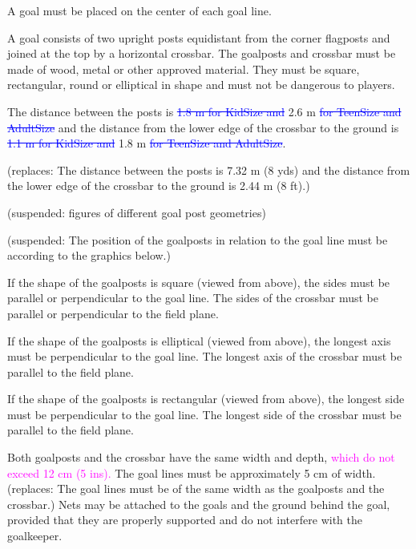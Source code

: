 \headlinebox

A goal must be placed on the center of each goal line.


\bigskip

A goal consists of two upright posts equidistant from the corner flagposts and joined at the top by a horizontal crossbar. The goalposts and crossbar must be made of wood, metal or other approved material. They must be square, rectangular, round or elliptical in shape and must
not be dangerous to players.

\bigskip

The distance between the posts is \textcolor{blue}{\sout{1.8 m for KidSize and}} 2.6 m \textcolor{blue}{\sout{for TeenSize and AdultSize}} and the distance from the lower edge of the crossbar to the ground is \textcolor{blue}{\sout{1.1 m for KidSize and}} 1.8 m \textcolor{blue}{\sout{for TeenSize and AdultSize}}. 

{\color[rgb]{0.4,0.4,0.4}
(replaces: The distance between the posts is 7.32 m (8 yds) and the distance from the lower edge of the crossbar to the ground is 2.44 m (8 ft).)}

\bigskip

{\color[rgb]{0.4,0.4,0.4}
(suspended: figures of different goal post geometries)}

\bigskip

{\color[rgb]{0.4,0.4,0.4}
(suspended: The position of the goalposts in relation to the goal line must be according to the graphics below.)}

\bigskip

If the shape of the goalposts is square (viewed from above), the sides must be parallel or perpendicular to the goal line. The sides of the crossbar must be parallel or perpendicular to the field plane.

\bigskip

If the shape of the goalposts is elliptical (viewed from above), the longest axis must be perpendicular to the goal line. The longest axis of the crossbar must be parallel to the field plane.

\bigskip

If the shape of the goalposts is rectangular (viewed from above), the longest side must be perpendicular to the goal line. The longest side of the crossbar must be parallel to the field plane.

\bigskip

Both goalposts and the crossbar have the same width and depth, \textcolor{magenta}{which do not exceed 12 cm (5 ins).} 
The goal lines must be approximately 5 cm of width. 
\textcolor[rgb]{0.4,0.4,0.4}{
(replaces: The goal lines must be of the same width as the goalposts and the crossbar.)} 
Nets may be attached to the goals and the ground behind the goal, provided that they are properly supported and do not interfere with the goalkeeper.

